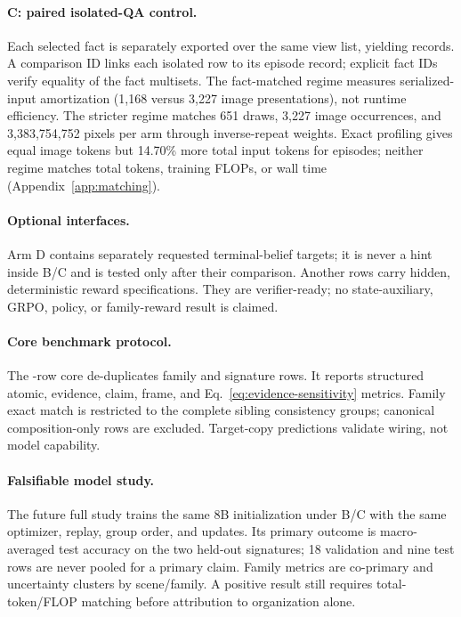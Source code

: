 \paragraph{C: paired isolated-QA control.}
Each selected fact is separately exported over the same view list, yielding
\EpiIsolatedRecords{} records.  A comparison ID links each isolated row to its
episode record; explicit fact IDs verify equality of the fact multisets.  The
fact-matched regime measures serialized-input amortization (1,168 versus 3,227
image presentations), not runtime efficiency.  The stricter regime matches 651
draws, 3,227 image occurrences, and 3,383,754,752 pixels per arm through
inverse-repeat weights.  Exact profiling gives equal image tokens but 14.70\%
more total input tokens for episodes; neither regime matches total tokens,
training FLOPs, or wall time (Appendix~\ref{app:matching}).

\paragraph{Optional interfaces.}
Arm D contains \EpiStateRecords{} separately requested terminal-belief targets;
it is never a hint inside B/C and is tested only after their comparison.
Another \EpiRLVRRecords{} rows carry hidden, deterministic reward
specifications.  They are verifier-ready; no state-auxiliary, GRPO, policy, or
family-reward result is claimed.

\paragraph{Core benchmark protocol.}
The \EpiCoreBenchmarkRecords{}-row core de-duplicates
\EpiFamilyBenchmarkRecords{} family and \EpiCompositionRecords{} signature
rows.  It reports structured atomic, evidence, claim, frame, and
Eq.~\ref{eq:evidence-sensitivity} metrics.  Family exact match is restricted to
the \EpiFamilyBenchmarkGroups{} complete sibling consistency groups; canonical
composition-only rows are excluded.  Target-copy predictions validate wiring,
not model capability.

\paragraph{Falsifiable model study.}
The future full study trains the same 8B initialization under B/C with the same
optimizer, replay, group order, and updates.  Its primary outcome is
macro-averaged test accuracy on the two held-out signatures; 18 validation and
nine test rows are never pooled for a primary claim.  Family metrics are
co-primary and uncertainty clusters by scene/family.  A positive result still
requires total-token/FLOP matching before attribution to organization alone.
